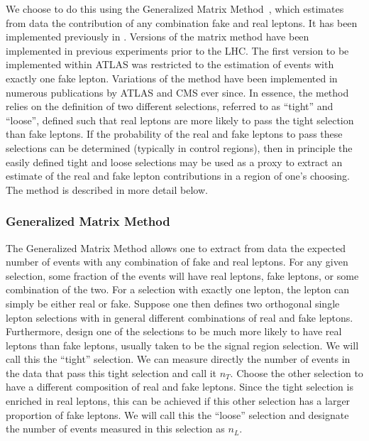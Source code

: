 We choose to do this using the Generalized Matrix Method~\cite{Gillam:2014xua}, 
which estimates from data the contribution of any combination
fake and real leptons. It has been implemented previously in 
\cite{Arguin:1558979}. Versions of the matrix
method have been implemented in previous experiments prior to the LHC.
The first version to be implemented within ATLAS
\cite{ATLAS-CONF-2010-087}
was restricted to the estimation of events with 
exactly one fake lepton.
Variations of the method have been implemented in numerous publications
by ATLAS and CMS ever since. %
In essence, the method relies on the definition of two different selections,
referred to as ``tight'' and ``loose'', defined such that
real leptons are more likely to pass the tight selection
than fake leptons. If the probability of the real and 
fake leptons to pass these selections can be determined (typically
in control regions), 
then in principle the easily defined
tight and loose selections may be used
as a proxy
to extract an estimate of the 
real and fake lepton
contributions in a region of one's choosing.
The method is described in more detail below.



\subsubsection{Generalized Matrix Method}
\label{sec:mxm}

The Generalized Matrix Method allows one to extract from data the expected
number of events with any combination of fake and real leptons.
For any given selection, some fraction of the events will have 
real leptons, fake leptons, or some combination of the two.
For a selection with exactly one lepton, the lepton 
can simply be either real or fake.  Suppose one then defines
two orthogonal single lepton
selections with in general different combinations of real and fake leptons.
Furthermore, design one of the selections to be much more likely to have
real leptons than fake leptons, usually taken 
to be the signal region selection. We will call this the ``tight'' selection.
We can measure directly the number of events in the data that
pass this tight selection and call it $n_T$. Choose the other selection
to have a different composition of real and fake leptons. Since the 
tight selection is enriched in real leptons, this can be achieved
if this other selection has a larger proportion of fake leptons.
We will call this the
``loose'' selection and designate the number of events measured
in this selection as $n_L$. 


